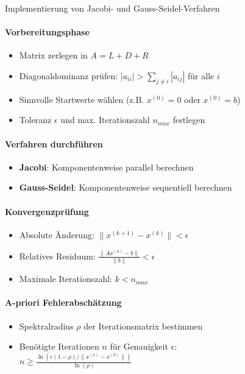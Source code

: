 \begin{KR}{Implementierung von Jacobi- und Gauss-Seidel-Verfahren}
    \paragraph{Vorbereitungsphase}
    \begin{itemize}
        \item Matrix zerlegen in $A = L + D + R$
        \item Diagonaldominanz prüfen: $|a_{ii}| > \sum_{j\neq i} |a_{ij}|$ für alle $i$
        \item Sinnvolle Startwerte wählen (z.B. $x^{(0)}=0$ oder $x^{(0)}=b$)
        \item Toleranz $\epsilon$ und max. Iterationszahl $n_{max}$ festlegen
    \end{itemize}

    \paragraph{Verfahren durchführen}
    \begin{itemize}
        \item \textbf{Jacobi}: Komponentenweise parallel berechnen 
        \item \textbf{Gauss-Seidel}: Komponentenweise sequentiell berechnen 
    \end{itemize}

    \paragraph{Konvergenzprüfung}
    \begin{itemize}
        \item Absolute Änderung: $\|x^{(k+1)} - x^{(k)}\| < \epsilon$
        \item Relatives Residuum: $\frac{\|Ax^{(k)} - b\|}{\|b\|} < \epsilon$
        \item Maximale Iterationszahl: $k < n_{max}$
    \end{itemize}

    \paragraph{A-priori Fehlerabschätzung}
    \begin{itemize}
        \item Spektralradius $\rho$ der Iterationsmatrix bestimmen
        \item Benötigte Iterationen $n$ für Genauigkeit $\epsilon$:\\
        $n \geq \frac{\ln(\epsilon(1-\rho)/\|x^{(1)}-x^{(0)}\|)}{\ln(\rho)}$
    \end{itemize}
\end{KR}

